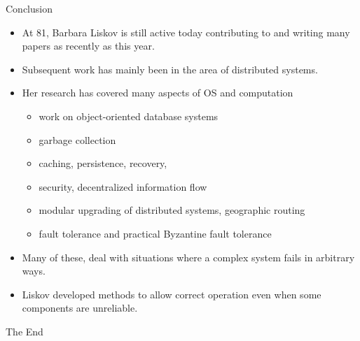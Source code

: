 \documentclass{beamer}
\begin{document}
\begin{frame}{Conclusion}
\begin{itemize}
\item At 81, Barbara Liskov is still active today contributing to and writing many papers as recently as this year.
\item Subsequent work has mainly been in the area of distributed systems. 
\item Her research has covered many aspects of OS and computation \begin{itemize}
    \item work on object-oriented database systems
    \item  garbage collection
    \item caching, persistence, recovery, 
    \item security, decentralized information flow
    \item modular upgrading of distributed systems, geographic routing
    \item fault tolerance and practical Byzantine fault tolerance
\end{itemize}  
\item Many of these, deal with situations where a complex system fails in arbitrary ways. 
\item Liskov developed methods to allow correct operation even when some components are unreliable.
 

\end{itemize}
\end{frame}




\begin{frame}
\Huge{\centerline{The End}}
\end{frame}
\end{document}
